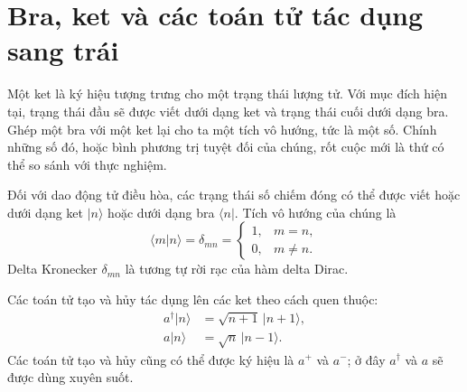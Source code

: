\section{Bra, ket và các toán tử tác dụng sang trái}

Một ket là ký hiệu tượng trưng cho một trạng thái lượng tử. Với mục đích hiện tại, trạng thái đầu sẽ được viết dưới dạng ket và trạng thái cuối dưới dạng bra. Ghép một bra với một ket lại cho ta một tích vô hướng, tức là một số. Chính những số đó, hoặc bình phương trị tuyệt đối của chúng, rốt cuộc mới là thứ có thể so sánh với thực nghiệm.

\begin{classroomqa}
\end{classroomqa}

Đối với dao động tử điều hòa, các trạng thái số chiếm đóng có thể được viết hoặc dưới dạng ket \(\lvert n\rangle\) hoặc dưới dạng bra \(\langle n\rvert\). Tích vô hướng của chúng là
\begin{equation}
\langle m\vert n\rangle=\delta_{mn}
=\begin{cases}
1,&m=n,\\
0,&m\neq n.
\end{cases}
\end{equation}
Delta Kronecker \(\delta_{mn}\) là tương tự rời rạc của hàm delta Dirac.

Các toán tử tạo và hủy tác dụng lên các ket theo cách quen thuộc:
\begin{align}
a^\dagger\lvert n\rangle&=\sqrt{n+1}\,\lvert n+1\rangle,\\
a\lvert n\rangle&=\sqrt n\,\lvert n-1\rangle.
\end{align}
Các toán tử tạo và hủy cũng có thể được ký hiệu là \(a^+\) và \(a^-\); ở đây \(a^\dagger\) và \(a\) sẽ được dùng xuyên suốt.

